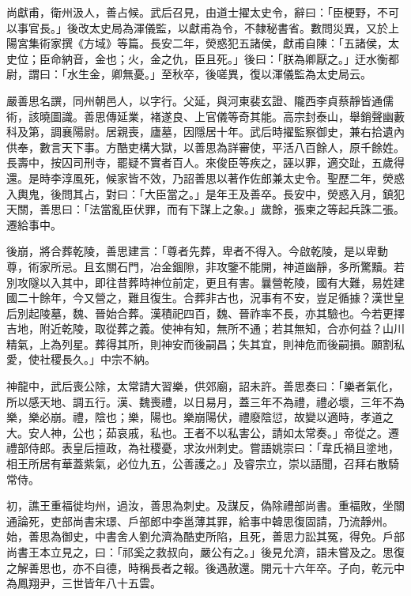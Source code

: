 \begin{pinyinscope}
 尚獻甫，衛州汲人，善占候。武后召見，由道士擢太史令，辭曰：「臣梗野，不可以事官長。」後改太史局為渾儀監，以獻甫為令，不隸秘書省。數問災異，又於上陽宮集術家撰《方域》等篇。長安二年，熒惑犯五諸侯，獻甫自陳：「五諸侯，太史位；臣命納音，金也；火，金之仇，臣且死。」後曰：「朕為卿厭之。」迂水衡都尉，謂曰：「水生金，卿無憂。」至秋卒，後嗟異，復以渾儀監為太史局云。



 嚴善思名譔，同州朝邑人，以字行。父延，與河東裴玄證、隴西李貞蔡靜皆通儒術，該曉圖識。善思傳延業，褚遂良、上官儀等奇其能。高宗封泰山，舉銷聲幽藪科及第，調襄陽尉。居親喪，廬墓，因隱居十年。武后時擢監察御史，兼右拾遺內供奉，數言天下事。方酷吏構大獄，以善思為詳審使，平活八百餘人，原千餘姓。長壽中，按囚司刑寺，罷疑不實者百人。來俊臣等疾之，誣以罪，適交趾，五歲得還。是時李淳風死，候家皆不效，乃詔善思以著作佐郎兼太史令。聖歷二年，熒惑入輿鬼，後問其占，對曰：「大臣當之。」是年王及善卒。長安中，熒惑入月，鎮犯天關，善思曰：「法當亂臣伏罪，而有下謀上之象。」歲餘，張柬之等起兵誅二張。遷給事中。



 後崩，將合葬乾陵，善思建言：「尊者先葬，卑者不得入。今啟乾陵，是以卑動尊，術家所忌。且玄關石門，冶金錮隙，非攻鑒不能開，神道幽靜，多所驚黷。若別攻隧以入其中，即往昔葬時神位前定，更且有害。曩營乾陵，國有大難，易姓建國二十餘年，今又營之，難且復生。合葬非古也，況事有不安，豈足循據？漢世皇后別起陵墓，魏、晉始合葬。漢積祀四百，魏、晉祚率不長，亦其驗也。今若更擇吉地，附近乾陵，取從葬之義。使神有知，無所不通；若其無知，合亦何益？山川精氣，上為列星。葬得其所，則神安而後嗣昌；失其宜，則神危而後嗣損。願割私愛，使社稷長久。」中宗不納。



 神龍中，武后喪公除，太常請大習樂，供郊廟，詔未許。善思奏曰：「樂者氣化，所以感天地、調五行。漢、魏喪禮，以日易月，蓋三年不為禮，禮必壞，三年不為樂，樂必崩。禮，陰也；樂，陽也。樂崩陽伏，禮廢陰愆，故變以適時，孝道之大。安人神，公也；茹哀戚，私也。王者不以私害公，請如太常奏。」帝從之。遷禮部侍郎。表皇后擅政，為社稷憂，求汝州刺史。嘗語姚崇曰：「韋氏禍且塗地，相王所居有華蓋紫氣，必位九五，公善護之。」及睿宗立，崇以語聞，召拜右散騎常侍。



 初，譙王重福徙均州，過汝，善思為刺史。及謀反，偽除禮部尚書。重福敗，坐關通論死，吏部尚書宋璟、戶部郎中李邕薄其罪，給事中韓思復固請，乃流靜州。始，善思為御史，中書舍人劉允濟為酷吏所陷，且死，善思力訟其冤，得免。戶部尚書王本立見之，曰：「祁奚之救叔向，嚴公有之。」後見允濟，語未嘗及之。思復之解善思也，亦不自德，時稱長者之報。後遇赦還。開元十六年卒。子向，乾元中為鳳翔尹，三世皆年八十五雲。




\end{pinyinscope}
